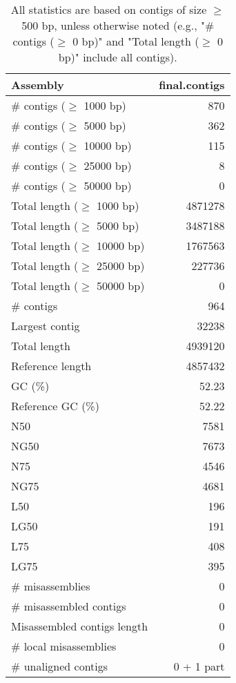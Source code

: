 \documentclass[12pt,a4paper]{article}
\begin{document}
\begin{table}[ht]
\begin{center}
\caption{All statistics are based on contigs of size $\geq$ 500 bp, unless otherwise noted (e.g., "\# contigs ($\geq$ 0 bp)" and "Total length ($\geq$ 0 bp)" include all contigs).}
\begin{tabular}{|l*{1}{|r}|}
\hline
Assembly & final.contigs \\ \hline
\# contigs ($\geq$ 1000 bp) & 870 \\ \hline
\# contigs ($\geq$ 5000 bp) & 362 \\ \hline
\# contigs ($\geq$ 10000 bp) & 115 \\ \hline
\# contigs ($\geq$ 25000 bp) & 8 \\ \hline
\# contigs ($\geq$ 50000 bp) & 0 \\ \hline
Total length ($\geq$ 1000 bp) & 4871278 \\ \hline
Total length ($\geq$ 5000 bp) & 3487188 \\ \hline
Total length ($\geq$ 10000 bp) & 1767563 \\ \hline
Total length ($\geq$ 25000 bp) & 227736 \\ \hline
Total length ($\geq$ 50000 bp) & 0 \\ \hline
\# contigs & 964 \\ \hline
Largest contig & 32238 \\ \hline
Total length & 4939120 \\ \hline
Reference length & 4857432 \\ \hline
GC (\%) & 52.23 \\ \hline
Reference GC (\%) & 52.22 \\ \hline
N50 & 7581 \\ \hline
NG50 & 7673 \\ \hline
N75 & 4546 \\ \hline
NG75 & 4681 \\ \hline
L50 & 196 \\ \hline
LG50 & 191 \\ \hline
L75 & 408 \\ \hline
LG75 & 395 \\ \hline
\# misassemblies & 0 \\ \hline
\# misassembled contigs & 0 \\ \hline
Misassembled contigs length & 0 \\ \hline
\# local misassemblies & 0 \\ \hline
\# unaligned contigs & 0 + 1 part \\ \hline

\end{tabular}
\end{center}
\end{table}
\end{document}

